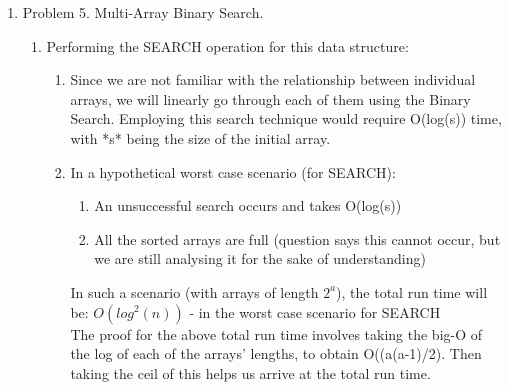 \documentclass[11pt]{article}
\begin{document}
\begin{enumerate}
\begin{enumerate}
    \end{enumerate}

\pagebreak
\item Problem 5. Multi-Array Binary Search.
    \begin{enumerate}
        \item Performing the SEARCH operation for this data structure: 
        \begin{enumerate}
            \item Since we are not familiar with the relationship between individual arrays, we will linearly go through each of them using the Binary Search. Employing this search technique would require O(log(s)) time, with *s* being the size of the initial array.
            \item In a hypothetical worst case scenario (for SEARCH):
            \begin{enumerate}
                \item An unsuccessful search occurs and takes O(log(s))  
                \item All the sorted arrays are full (question says this cannot occur, but we are still analysing it for the sake of understanding)
            \end{enumerate}
            In such a scenario (with arrays of length $2^a$), the total run time will be: $O(log^2(n))$ - in the worst case scenario for SEARCH\\
            The proof for the above total run time involves taking the big-O of the log of each of the arrays' lengths, to obtain O((a(a-1)/2). Then taking the ceil of this helps us arrive at the total run time.
        \end{enumerate}
        

\end{enumerate}
\end{enumerate}
\end{document}

